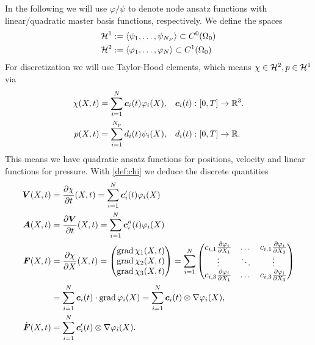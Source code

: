 In the following we will use $\varphi/\psi$ to denote node ansatz functions with linear/quadratic master basis functions, respectively.
We define the spaces
\begin{align*}
	\mathcal{H}^1 &:= \langle \psi_1,\ldots,\psi_{N_P} \rangle \subset C^0(\Omega_0)\\
	\mathcal{H}^2 &:= \langle \varphi_1,\ldots,\varphi_N \rangle \subset C^1(\Omega_0)
\end{align*} 
For discretization we will use Taylor-Hood elements, which means $\chi\in\mathcal{H}^2, p\in\mathcal{H}^1$ via
\begin{align}
	\chi(X,t) &= \sum\limits_{i=1}^{N} \boldsymbol{c}_i(t)\varphi_i(X), && \boldsymbol{c}_i(t):[0,T] \to\mathbb{R}^3.\label{def:chi}\\
	p(X,t) &= \sum\limits_{i=1}^{N_p} d_i(t)\psi_i(X), && d_i(t):[0,T] \to\mathbb{R}.
\end{align}
This means we have quadratic ansatz functions for positions, velocity and linear functions for pressure.
With \eqref{def:chi} we deduce the discrete quantities
\begin{align*}
	\boldsymbol{V}(X,t) &= \frac{\partial \chi}{\partial t}(X,t) = \sum\limits_{i=1}^{N} \boldsymbol{c}_i'(t)\varphi_i(X)\\
	\boldsymbol{A}(X,t) &= \frac{\partial \boldsymbol{V}}{\partial t}(X,t) = \sum\limits_{i=1}^{N} \boldsymbol{c}_i''(t)\varphi_i(X)\\
	\boldsymbol{F}(X,t) &= \frac{\partial \chi}{\partial X}(X,t) = \left(\begin{matrix}\operatorname{grad} \chi_1(X,t)\\ \operatorname{grad} \chi_2(X,t)\\ \operatorname{grad} \chi_3(X,t)\end{matrix}\right)
		   = \sum\limits_{i=1}^{N}\left(\begin{matrix}c_{i,1}\frac{\partial \varphi_i}{\partial X_1} & \dots & c_{i,1}\frac{\partial \varphi_i}{\partial X_3}\\
		   				\vdots & \ddots & \vdots\\
		   				c_{i,3}\frac{\partial \varphi_i}{\partial X_1} & \dots & c_{i,3}\frac{\partial \varphi_i}{\partial X_3}\end{matrix}\right)\\
		   &=\sum\limits_{i=1}^{N} \boldsymbol{c}_i(t)\cdot \operatorname{grad}\varphi_i(X) = \sum\limits_{i=1}^{N} \boldsymbol{c}_i(t)\otimes \nabla\varphi_{i}(X),\\
	\dot{\boldsymbol{F}}(X,t) &= \sum\limits_{i=1}^{N} \boldsymbol{c}'_i(t)\otimes \nabla\varphi_{i}(X).
\end{align*}

